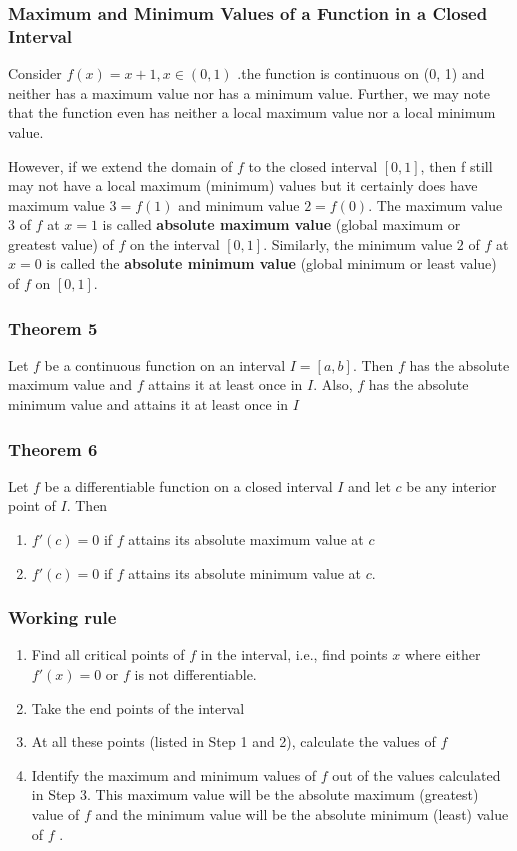 \documentclass[12pt]{article}
\begin{document}
\subsubsection*{Maximum and Minimum Values of a Function in a Closed Interval}

Consider $f(x)=x+1,x \in (0,1)$ .the function is continuous on (0, 1) and neither has a maximum value
nor has a minimum value. Further, we may note that the function even has neither a
local maximum value nor a local minimum value.

However, if we extend the domain of $f$ to the closed interval $[0, 1]$, then f still may
not have a local maximum (minimum) values but it certainly does have maximum value
$3 = f (1)$ and minimum value $2 = f (0)$. The maximum value $3$ of $f$ at $x = 1$ is called
\textbf{absolute maximum value} (global maximum or greatest value) of $f$ on the interval
$[0, 1]$. Similarly, the minimum value $2$ of $f$ at $x = 0$ is called the \textbf{absolute minimum
value} (global minimum or least value) of $f$ on $[0, 1]$.

\subsubsection*{Theorem 5}
Let $f$ be a continuous function on an interval $I = [a, b]$. Then $f$ has the
absolute maximum value and $f$ attains it at least once in $I$. Also, $f$ has the absolute
minimum value and attains it at least once in $I$

\subsubsection*{Theorem 6}
Let $f$ be a differentiable function on a closed interval $I$ and let $c$ be any
interior point of $I$. Then
\begin{enumerate}
    \item $f '(c) = 0$ if $f$ attains its absolute maximum value at $c$
    \item $f'(c) = 0$ if $f$ attains its absolute minimum value at $c$.
\end{enumerate}

\subsubsection*{Working rule}
\begin{enumerate}
    \item Find all critical points of $f$ in the interval, i.e., find points $x$ where either
    $f ' ( x) = 0$ or $f$ is not differentiable.
    \item Take the end points of the interval
    \item At all these points (listed in Step 1 and 2), calculate the values of $f$
    \item Identify the maximum and minimum values of $f$ out of the values calculated in
    Step 3. This maximum value will be the absolute maximum (greatest) value of
    $f$ and the minimum value will be the absolute minimum (least) value of $f$ .
\end{enumerate}
\end{document}
